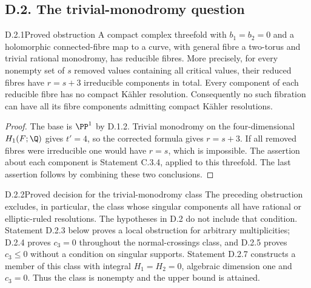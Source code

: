 \subsection{D.2. The trivial-monodromy question}


\begin{idstatement}{D.2.1}{Proved obstruction}\label{st:D.2.1}
A compact complex threefold with $b_1=b_2=0$ and a holomorphic
connected-fibre map to a curve, with general fibre a two-torus and
trivial rational monodromy, has reducible fibres. More precisely,
for every nonempty set of $s$ removed values containing all critical
values, their reduced fibres have $r=s+3$ irreducible components in
total. Every component of each reducible fibre has no compact
K\"ahler resolution. Consequently no such fibration can have all
its fibre components admitting compact K\"ahler resolutions.
\end{idstatement}
\begin{proof}
The base is $\PP^1$ by D.1.2. Trivial monodromy on the
four-dimensional $H_1(F;\Q)$ gives $t'=4$, so the corrected formula
gives $r=s+3$. If all removed fibres were irreducible one would have
$r=s$, which is impossible. The assertion about each component is
Statement C.3.4, applied to this threefold. The last assertion follows
by combining these two conclusions.
\end{proof}



\begin{idstatement}{D.2.2}{Proved decision for the trivial-monodromy class}\label{st:D.2.2}
The preceding obstruction excludes, in particular, the class whose
singular components all have rational or elliptic-ruled resolutions.
The hypotheses in D.2 do not include that condition. Statement
D.2.3 below proves a local obstruction for arbitrary multiplicities;
D.2.4 proves $c_3=0$ throughout the normal-crossings class, and
D.2.5 proves $c_3\le0$ without a condition on singular supports.
Statement D.2.7 constructs a member of this class with
integral $H_1=H_2=0$, algebraic dimension one and $c_3=0$.
Thus the class is nonempty and the upper bound is attained.
\end{idstatement}



